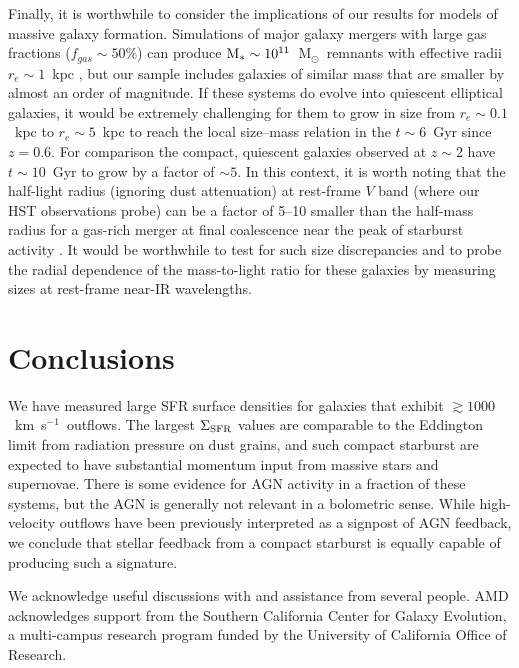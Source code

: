 \documentclass[apj]{emulateapj}
\newcommand{\kms}{km~s$^{-1}$}
\newcommand{\msun}{M$_{\odot}$}
\newcommand{\mstar}{M$_{*}$}
\newcommand{\sigmasfr}{\Sigma_{\textnormal{\scriptsize{SFR}}}}
\begin{document}
Finally, it is worthwhile to consider the implications of our results
for models of massive galaxy formation.  Simulations of major galaxy
mergers with large gas fractions ($f_{gas}\sim50$\%) can produce
$\textnormal{\mstar}\sim10^{11}$~\msun\ remnants with effective radii
$r_{e}\sim1$~kpc \citep[e.g.,][]{wuy10}, but our sample includes
galaxies of similar mass that are smaller by almost an order of
magnitude.  If these systems do evolve into quiescent elliptical
galaxies, it would be extremely challenging for them to grow in size
from $r_e\sim0.1$~kpc to $r_e\sim5$~kpc to reach the local size--mass
relation \citep{she03} in the $t\sim6$~Gyr since $z=0.6$.  For
comparison the compact, quiescent galaxies observed at $z\sim2$
\citep[e.g.,][]{tru07,van08} have $t\sim10$~Gyr to grow by a factor of
$\sim5$.  In this context, it is worth noting that the half-light
radius (ignoring dust attenuation) at rest-frame $V$ band (where our
HST observations probe) can be a factor of 5--10 smaller than the
half-mass radius for a gas-rich merger at final coalescence near the
peak of starburst activity \citep{wuy10}.  It would be worthwhile to
test for such size discrepancies and to probe the radial dependence of
the mass-to-light ratio for these galaxies by measuring sizes at
rest-frame near-IR wavelengths.

 

\section{Conclusions}

We have measured large SFR surface densities for galaxies that exhibit
$\gtrsim1000$~\kms\ outflows.  The largest $\sigmasfr$ values are
comparable to the Eddington limit from radiation pressure on dust
grains, and such compact starburst are expected to have substantial
momentum input from massive stars and supernovae.  There is some
evidence for AGN activity in a fraction of these systems, but the AGN
is generally not relevant in a bolometric sense.  While high-velocity
outflows have been previously interpreted as a signpost of AGN
feedback, we conclude that stellar feedback from a compact starburst
is equally capable of producing such a signature.


\acknowledgments

We acknowledge useful discussions with and assistance from several
people.  AMD acknowledges support from the Southern California Center
for Galaxy Evolution, a multi-campus research program funded by the
University of California Office of Research.
\end{document}

